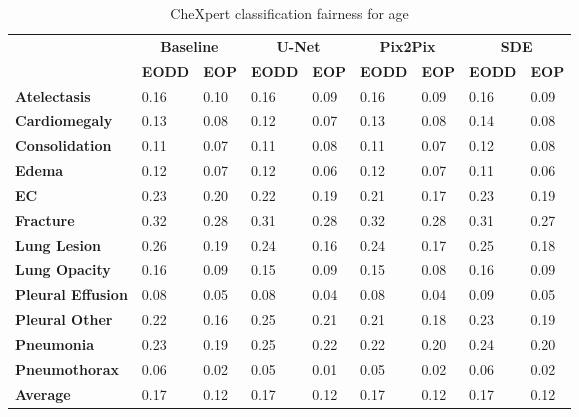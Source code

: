 \begin{table}[]
    \centering
    \caption{CheXpert classification fairness for age}\label{tab:chex_age}
    \begin{tabular}{l|llllllll}
    \hline
    \multirow{2}{*}{\textbf{}} & \multicolumn{2}{c|}{\textbf{Baseline}}                   & \multicolumn{2}{c|}{\textbf{U-Net}}                              & \multicolumn{2}{c|}{\textbf{Pix2Pix}}                              & \multicolumn{2}{c}{\textbf{SDE}}    \\ \cline{2-9}
                                                                                       & \textbf{EODD} & \textbf{EOP}  & \textbf{EODD} & \textbf{EOP}  & \textbf{EODD} & \textbf{EOP} & \textbf{EODD} & \textbf{EOP} \\ \hline
    \textbf{Atelectasis}  & 0.16 & 0.10 & 0.16 & 0.09 & 0.16 & 0.09 & 0.16 & 0.09 \\        
    \textbf{Cardiomegaly} & 0.13 & 0.08 & 0.12 & 0.07 & 0.13 & 0.08 & 0.14 & 0.08 \\
    \textbf{Consolidation} & 0.11 & 0.07 & 0.11 & 0.08 & 0.11 & 0.07 & 0.12 & 0.08 \\
    \textbf{Edema} & 0.12 & 0.07 & 0.12 & 0.06 & 0.12 & 0.07 & 0.11 & 0.06 \\
    \textbf{EC} & 0.23 & 0.20 & 0.22 & 0.19 & 0.21 & 0.17 & 0.23 & 0.19 \\
    \textbf{Fracture} & 0.32 & 0.28 & 0.31 & 0.28 & 0.32 & 0.28 & 0.31 & 0.27 \\
    \textbf{Lung Lesion} & 0.26 & 0.19 & 0.24 & 0.16 & 0.24 & 0.17 & 0.25 & 0.18 \\
    \textbf{Lung Opacity} & 0.16 & 0.09 & 0.15 & 0.09 & 0.15 & 0.08 & 0.16 & 0.09 \\
    \textbf{Pleural Effusion} & 0.08 & 0.05 & 0.08 & 0.04 & 0.08 & 0.04 & 0.09 & 0.05 \\
    \textbf{Pleural Other} & 0.22 & 0.16 & 0.25 & 0.21 & 0.21 & 0.18 & 0.23 & 0.19 \\
    \textbf{Pneumonia} & 0.23 & 0.19 & 0.25 & 0.22 & 0.22 & 0.20 & 0.24 & 0.20 \\
    \textbf{Pneumothorax} & 0.06 & 0.02 & 0.05 & 0.01 & 0.05 & 0.02 & 0.06 & 0.02 \\
    \textbf{Average} & 0.17 & 0.12 & 0.17 & 0.12 & 0.17 & 0.12 & 0.17 & 0.12 \\ \hline
    \end{tabular}
    \end{table}
    
